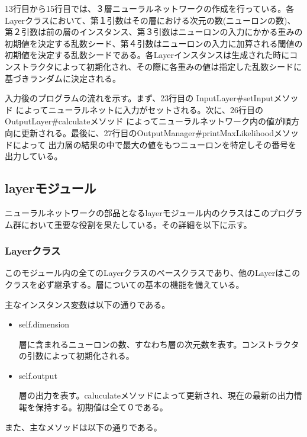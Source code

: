 \documentclass{ujarticle} %
\begin{document}
13行目から15行目では、３層ニューラルネットワークの作成を行っている。各Layerクラスにおいて、第１引数はその層における次元の数(ニューロンの数)、第２引数は前の層のインスタンス、第３引数はニューロンの入力にかかる重みの初期値を決定する乱数シード、第４引数はニューロンの入力に加算される閾値の初期値を決定する乱数シードである。各Layerインスタンスは生成された時にコンストラクタによって初期化され、その際に各重みの値は指定した乱数シードに基づきランダムに決定される。

入力後のプログラムの流れを示す。まず、23行目の InputLayer\#setInputメソッド によってニューラルネットに入力がセットされる。次に、26行目のOutputLayer\#calculateメソッド によってニューラルネットワーク内の値が順方向に更新される。最後に、27行目のOutputManager\#printMaxLikelihoodメソッドによって 出力層の結果の中で最大の値をもつニューロンを特定しその番号を出力している。

\subsection{layerモジュール}
ニューラルネットワークの部品となるlayerモジュール内のクラスはこのプログラム群において重要な役割を果たしている。その詳細を以下に示す。

\subsubsection{Layerクラス}
このモジュール内の全てのLayerクラスのベースクラスであり、他のLayerはこのクラスを必ず継承する。層についての基本の機能を備えている。

主なインスタンス変数は以下の通りである。
\begin{itemize}
  \item self.dimension

  層に含まれるニューロンの数、すなわち層の次元数を表す。コンストラクタの引数によって初期化される。

  \item self.output

  層の出力を表す。caluculateメソッドによって更新され、現在の最新の出力情報を保持する。初期値は全て０である。

\end{itemize}

また、主なメソッドは以下の通りである。
\end{document}
